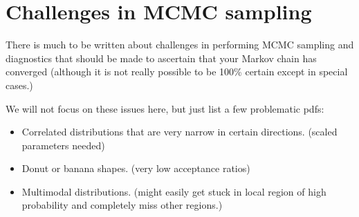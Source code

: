 \documentclass[%
oneside,                 %
final,                   %
10pt]{article}
\begin{document}
\noindent
\section{Challenges in MCMC sampling}
There is much to be written about challenges in performing MCMC sampling and diagnostics that should be made to ascertain that your Markov chain has converged (although it is not really possible to be 100\% certain except in special cases.)

We will not focus on these issues here, but just list a few problematic pdfs:
\begin{itemize}
\item Correlated distributions that are very narrow in certain directions. (scaled parameters needed)

\item Donut or banana shapes. (very low acceptance ratios)

\item Multimodal distributions. (might easily get stuck in local region of high probability and completely miss other regions.)
\end{itemize}

\noindent


\end{document}
